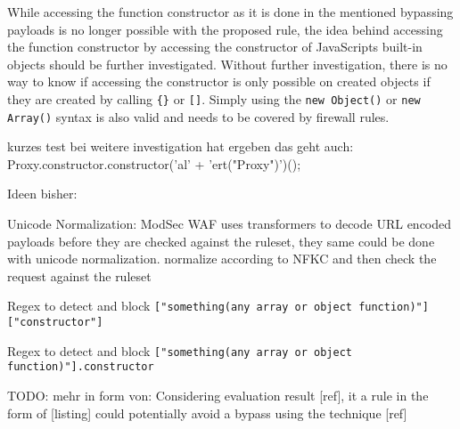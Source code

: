 While accessing the function constructor as it is done in the mentioned bypassing payloads is no longer possible with the proposed rule, the idea behind accessing the function constructor by accessing the constructor of JavaScripts built-in objects should be further investigated. Without further investigation, there is no way to know if accessing the constructor is only possible on created objects if they are created by calling \verb|{}| or \verb|[]|. Simply using the \verb|new Object()| or \verb|new Array()| syntax is also valid and needs to be covered by firewall rules.

	{\color{blue}kurzes test bei weitere investigation hat ergeben das geht auch: Proxy.constructor.constructor('al' + 'ert("Proxy")')(); }


	{\color{red}Ideen bisher:}

Unicode Normalization: ModSec WAF uses transformers to decode URL encoded payloads before they are checked against the ruleset, they same could be done with unicode normalization. normalize according to NFKC and then check the request against the ruleset

Regex to detect and block \verb|["something(any array or object function)"]["constructor"]|

Regex to detect and block \verb|["something(any array or object function)"].constructor|






{\color{red} TODO: mehr in form von: Considering evaluation result [ref], it a rule in the form of [listing] could potentially avoid a bypass using the technique [ref]}
